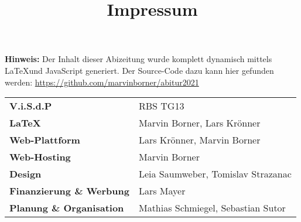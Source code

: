 \title{Impressum}


\textbf{Hinweis:} Der Inhalt dieser Abizeitung wurde komplett dynamisch mittels \LaTeX und JavaScript generiert. Der Source-Code dazu kann hier gefunden werden: \url{https://github.com/marvinborner/abitur2021}
\newline
\begin{table}[b]
	\begin{tabular}{ l l }
		\textbf{V.i.S.d.P}               & RBS TG13                           \\ %
		\textbf{\LaTeX}                  & Marvin Borner, Lars Krönner        \\
		\textbf{Web-Plattform}           & Lars Krönner, Marvin Borner        \\
		\textbf{Web-Hosting}             & Marvin Borner                      \\
		\textbf{Design}                  & Leia Saumweber, Tomislav Strazanac \\
		\textbf{Finanzierung \& Werbung} & Lars Mayer                         \\
		\textbf{Planung \& Organisation} & Mathias Schmiegel, Sebastian Sutor \\
	\end{tabular}
\end{table}
